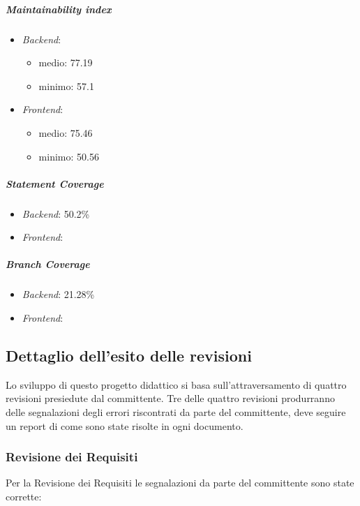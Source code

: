 	\subparagraph{Maintainability index}
	\begin{itemize}
		\item \emph{Backend}: 
		\begin{itemize}
			\item medio: 77.19
			\item minimo: 57.1
		\end{itemize} 
		\item \emph{Frontend}: 
		\begin{itemize}
			\item medio: 75.46
			\item minimo: 50.56
		\end{itemize} 
	\end{itemize}


	\subparagraph{Statement Coverage}
	\begin{itemize}
		\item \emph{Backend}: 50.2\%
		\item \emph{Frontend}: 
	\end{itemize}
	

	\subparagraph{Branch Coverage}
	\begin{itemize}
		\item \emph{Backend}: 21.28\%
		\item \emph{Frontend}:
	\end{itemize}
	

	\subsection{Dettaglio dell'esito delle revisioni}
	Lo sviluppo di questo progetto didattico si basa sull'attraversamento di quattro revisioni presiedute dal committente. Tre delle quattro revisioni produrranno delle segnalazioni degli errori riscontrati da parte del committente, deve seguire un report di come sono state risolte in ogni documento.
		
		\subsubsection{Revisione dei Requisiti}
		Per la Revisione dei Requisiti le segnalazioni da parte del committente sono state corrette:
		
